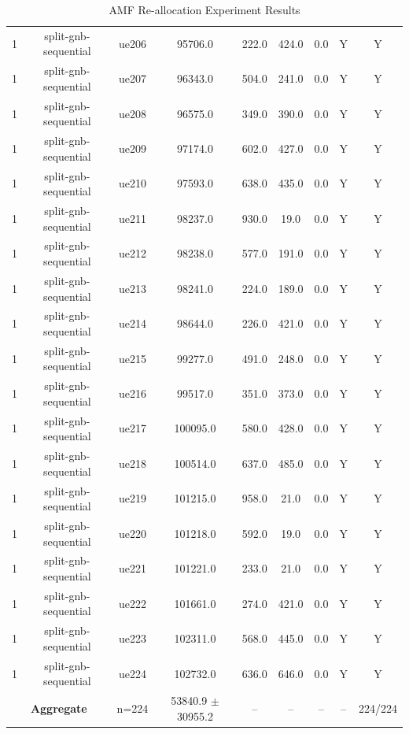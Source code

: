 \begin{table}[ht]
\begin{tabular}{|c|c|c|c|c|c|c|c|c|}
1 & split-gnb-sequential & ue206 & 95706.0 & 222.0 & 424.0 & 0.0 & Y & Y \\
1 & split-gnb-sequential & ue207 & 96343.0 & 504.0 & 241.0 & 0.0 & Y & Y \\
1 & split-gnb-sequential & ue208 & 96575.0 & 349.0 & 390.0 & 0.0 & Y & Y \\
1 & split-gnb-sequential & ue209 & 97174.0 & 602.0 & 427.0 & 0.0 & Y & Y \\
1 & split-gnb-sequential & ue210 & 97593.0 & 638.0 & 435.0 & 0.0 & Y & Y \\
1 & split-gnb-sequential & ue211 & 98237.0 & 930.0 & 19.0 & 0.0 & Y & Y \\
1 & split-gnb-sequential & ue212 & 98238.0 & 577.0 & 191.0 & 0.0 & Y & Y \\
1 & split-gnb-sequential & ue213 & 98241.0 & 224.0 & 189.0 & 0.0 & Y & Y \\
1 & split-gnb-sequential & ue214 & 98644.0 & 226.0 & 421.0 & 0.0 & Y & Y \\
1 & split-gnb-sequential & ue215 & 99277.0 & 491.0 & 248.0 & 0.0 & Y & Y \\
1 & split-gnb-sequential & ue216 & 99517.0 & 351.0 & 373.0 & 0.0 & Y & Y \\
1 & split-gnb-sequential & ue217 & 100095.0 & 580.0 & 428.0 & 0.0 & Y & Y \\
1 & split-gnb-sequential & ue218 & 100514.0 & 637.0 & 485.0 & 0.0 & Y & Y \\
1 & split-gnb-sequential & ue219 & 101215.0 & 958.0 & 21.0 & 0.0 & Y & Y \\
1 & split-gnb-sequential & ue220 & 101218.0 & 592.0 & 19.0 & 0.0 & Y & Y \\
1 & split-gnb-sequential & ue221 & 101221.0 & 233.0 & 21.0 & 0.0 & Y & Y \\
1 & split-gnb-sequential & ue222 & 101661.0 & 274.0 & 421.0 & 0.0 & Y & Y \\
1 & split-gnb-sequential & ue223 & 102311.0 & 568.0 & 445.0 & 0.0 & Y & Y \\
1 & split-gnb-sequential & ue224 & 102732.0 & 636.0 & 646.0 & 0.0 & Y & Y \\
\multicolumn{2}{|c|}{\textbf{Aggregate}} & n=224 & 53840.9 $\pm$ 30955.2 & -- & -- & -- & -- & 224/224 \\
\hline
\end{tabular}
\caption{AMF Re-allocation Experiment Results}
\label{tab:amf_realloc}
\end{table}
